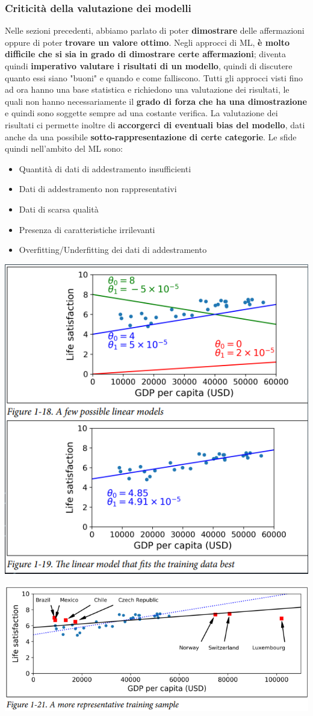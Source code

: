\documentclass[12pt]{article}
\begin{document}
\subsubsection{Criticità della valutazione dei modelli}
Nelle sezioni precedenti, abbiamo parlato di poter \textbf{dimostrare} delle affermazioni oppure di poter \textbf{trovare un valore ottimo}.
Negli approcci di ML, \textbf{è molto difficile che si sia in grado di dimostrare certe affermazioni}; diventa quindi \textbf{imperativo valutare i risultati di un modello},
quindi di discutere quanto essi siano "buoni" e quando e come falliscono. Tutti gli approcci visti fino ad ora hanno una base statistica e richiedono una valutazione dei risultati, le quali
non hanno necessariamente il \textbf{grado di forza che ha una dimostrazione} e quindi sono soggette sempre ad una costante verifica.
La valutazione dei risultati ci permette inoltre di \textbf{accorgerci di eventuali bias del modello}, dati anche da una possibile \textbf{sotto-rappresentazione di certe categorie}.
Le sfide quindi nell'ambito del ML sono:
\begin{itemize}
    \item Quantità di dati di addestramento insufficienti
    \item Dati di addestramento non rappresentativi
    \item Dati di scarsa qualità
    \item Presenza di caratteristiche irrilevanti
    \item Overfitting/Underfitting dei dati di addestramento
\end{itemize}
\begin{center}
    \includegraphics[width =0.80\linewidth]{Images/66.PNG}
\end{center}
\begin{center}
    \includegraphics[width =0.80\linewidth]{Images/67.PNG}
\end{center}
\end{document}
